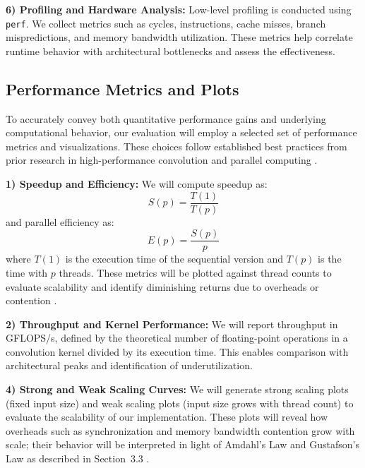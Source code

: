 \documentclass[conference, 10pt]{IEEEtran}
\begin{document}
\vspace{0.5em}
\textbf{6) Profiling and Hardware Analysis:} Low-level profiling is conducted using \texttt{perf}. We collect metrics such as cycles, instructions, cache misses, branch mispredictions, and memory bandwidth utilization. These metrics help correlate runtime behavior with architectural bottlenecks and assess the effectiveness.


\subsection{\textbf{Performance Metrics and Plots}}

To accurately convey both quantitative performance gains and underlying computational behavior, our evaluation will employ a selected set of performance metrics and visualizations. These choices follow established best practices from prior research in high-performance convolution and parallel computing \cite{Wang2023,  hager2021hpc, Rajput2013, Yoon2012}.

\vspace{0.5em}
\textbf{1) Speedup and Efficiency:} 
We will compute speedup as:
\begin{equation}
    S(p) = \frac{T(1)}{T(p)}
\end{equation}
and parallel efficiency as:
\begin{equation}
    E(p) = \frac{S(p)}{p}
\end{equation}
where \(T(1)\) is the execution time of the sequential version and \(T(p)\) is the time with \(p\) threads. These metrics will be plotted against thread counts to evaluate scalability and identify diminishing returns due to overheads or contention \cite{Rajput2013}.

\vspace{0.5em}
\textbf{2) Throughput and Kernel Performance:} 
We will report throughput in GFLOPS/s, defined by the theoretical number of floating-point operations in a convolution kernel divided by its execution time. This enables comparison with architectural peaks and identification of underutilization.

\textbf{4) Strong and Weak Scaling Curves:} 
We will generate strong scaling plots (fixed input size) and weak scaling plots (input size grows with thread count) to evaluate the scalability of our implementation. These plots will reveal how overheads such as synchronization and memory bandwidth contention grow with scale; their behavior will be interpreted in light of Amdahl’s Law and Gustafson’s Law as described in Section~3.3 \cite{hager2021hpc, Gustafson1988}.
\end{document}
